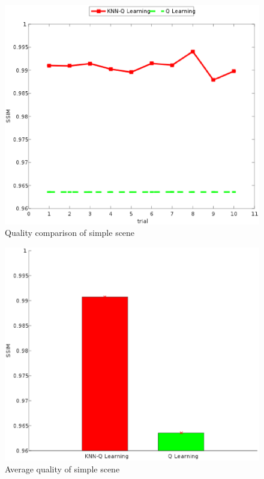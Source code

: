 \documentclass[twocolumn]{article}
\begin{document}
\begin{figure}[htbp]
\centering
\includegraphics[width=\columnwidth]{simple_ssim_compare}
\caption{Quality comparison of simple scene }
\label{simple_ssim_compare}
\end{figure}
\begin{figure}[htbp]
\centering
\includegraphics[width=\columnwidth]{simple_ssim_bar_graph}
\caption{Average quality of simple scene}
\label{simple_ssim_bar_graph}
\end{figure}
\end{document}
